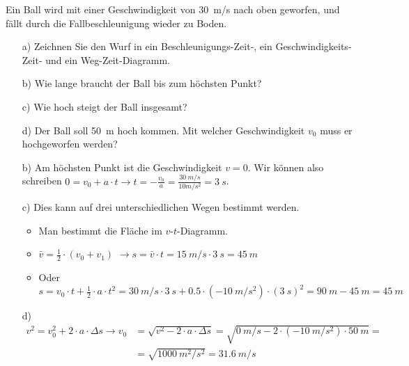 

\begin{aufgabe}
Ein Ball wird mit einer Geschwindigkeit von \SI{30}{m/s} nach oben geworfen, und fällt
durch die Fallbeschleunigung wieder zu Boden.
\begin{itemize}
	\item[a)] Zeichnen Sie den Wurf in ein Beschleunigungs-Zeit-, ein Geschwindigkeits-Zeit- und ein Weg-Zeit-Diagramm.
	\item[b)] Wie lange braucht der Ball bis zum höchsten Punkt?
	\item[c)] Wie hoch steigt der Ball insgesamt?
	\item[d)] Der Ball soll \SI{50}{m} hoch kommen. Mit welcher Geschwindigkeit $v_0$ muss er hochgeworfen werden?
\end{itemize}
\begin{loesung}
\begin{itemize}
	\item[b)] Am höchsten Punkt ist die Geschwindigkeit $v=0$. Wir können also schreiben $0 = v_0 + a\cdot t \to t=-\frac{v_0}{a}=\frac{\SI{30}{m/s}}{{10}{m/s^2}}=\SI{3}{s}$.

	\item[c)] Dies kann auf drei unterschiedlichen Wegen bestimmt werden. 
\begin{itemize}
	\item Man bestimmt die Fläche im $v$-$t$-Diagramm.
	\item $\bar{v}=\frac{1}{2}\cdot (v_0+v_1)$ $\to s=\bar{v}\cdot t=\SI{15}{m/s}\cdot\SI{3}{s}=\SI{45}{m}$
	\item Oder $s=v_0\cdot t +\frac{1}{2}\cdot a \cdot t^2 = \SI{30}{m/s}\cdot\SI{3}{s}+0.5\cdot(\SI{-10}{m/s^2})\cdot(\SI{3}{s})^2=\SI{90}{m}-\SI{45}{m}=\SI{45}{m}$
\end{itemize}
	\item[d)]
		\begin{align*}
		v^2=v_0^2 + 2\cdot a \cdot \Delta s \to v_0 &= \sqrt{v^2 - 2\cdot a \cdot \Delta s}=\sqrt{\SI{0}{m/s} - 2\cdot (\SI{-10}{m/s^2})\cdot\SI{50}{m}}=\\
			&=\sqrt{\SI{1000}{m^2/s^2}}=\SI{31.6}{m/s}
		\end{align*}
\end{itemize}


\end{loesung}
\end{aufgabe}
